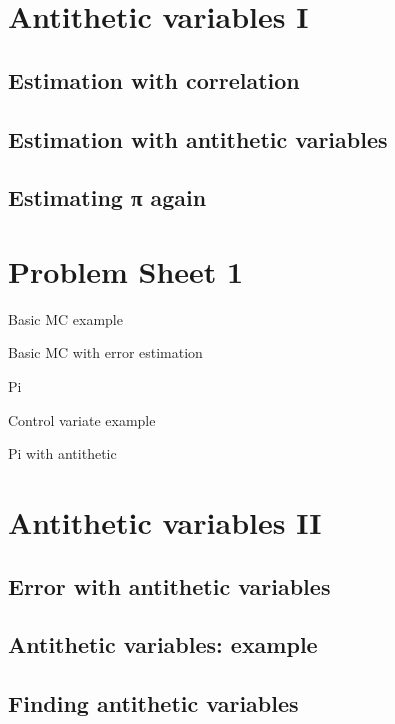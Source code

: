 \documentclass[
  letterpaper,
  DIV=11,
  numbers=noendperiod]{scrreprt}
\theoremstyle{definition}
\theoremstyle{definition}
\theoremstyle{remark}
\begin{document}
\chapter{Antithetic variables I}\label{antithetic-variables-i}

\section{Estimation with correlation}\label{estimation-with-correlation}

\section{Estimation with antithetic
variables}\label{estimation-with-antithetic-variables}

\section{Estimating π again}\label{estimating-ux3c0-again}

\chapter*{Problem Sheet 1}\label{problem-sheet-1}


Basic MC example

Basic MC with error estimation

Pi

Control variate example

Pi with antithetic

\chapter{Antithetic variables II}\label{antithetic-variables-ii}

\section{Error with antithetic
variables}\label{error-with-antithetic-variables}

\section{Antithetic variables:
example}\label{antithetic-variables-example}

\section{Finding antithetic
variables}\label{finding-antithetic-variables}
\end{document}
